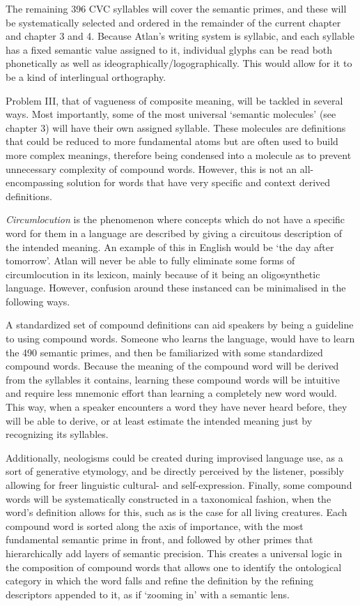The remaining 396 CVC syllables will cover the semantic primes, and these will be systematically selected and ordered in the remainder of the current chapter and chapter 3 and 4. Because Atlan’s writing system is syllabic, and each syllable has a fixed semantic value assigned to it, individual glyphs can be read both phonetically as well as ideographically/logographically. This would allow for it to be a kind of interlingual orthography. 

Problem III, that of vagueness of composite meaning, will be tackled in several ways. Most importantly, some of the most universal ‘semantic molecules’ (see chapter 3) will have their own assigned syllable. These molecules are definitions that could be reduced to more fundamental atoms but are often used to build more complex meanings, therefore being condensed into a molecule as to prevent unnecessary complexity of compound  words. However, this is not an all-encompassing solution for words that have very specific and context derived definitions. 

{\it Circumlocution} is the phenomenon where concepts which do not have a specific word for them in a language are described by giving a circuitous description of the intended meaning. An example of this in English would be ‘the day after tomorrow’. Atlan will never be able to fully eliminate some forms of circumlocution in its lexicon, mainly because of it being an oligosynthetic language. However, confusion around  these instanced can be minimalised in the following ways.  

A standardized set of compound  definitions can aid speakers by being a guideline to using compound  words. Someone who learns the language, would have to learn the 490 semantic primes, and then be familiarized with some standardized compound  words. Because the meaning of the compound  word will be derived from the syllables it contains, learning these compound  words will be intuitive and require less mnemonic effort than learning a completely new word would. This way, when a speaker encounters a word they have never heard before, they will be able to derive, or at least estimate the intended meaning just by recognizing its syllables.

Additionally, neologisms could be created during improvised language use, as a sort of generative etymology, and be directly perceived by the listener, possibly allowing for freer linguistic cultural- and self-expression. Finally, some compound  words will be systematically constructed in a taxonomical fashion, when the word’s definition allows for this, such as is the case for all living creatures. Each compound  word is sorted along the axis of importance, with the most fundamental semantic prime in front, and followed by other primes that hierarchically add layers of semantic precision. This creates a universal logic in the composition of compound  words that allows one to identify the ontological category in which the word falls and refine the definition by the refining descriptors appended to it, as if ‘zooming in’ with a semantic lens.


